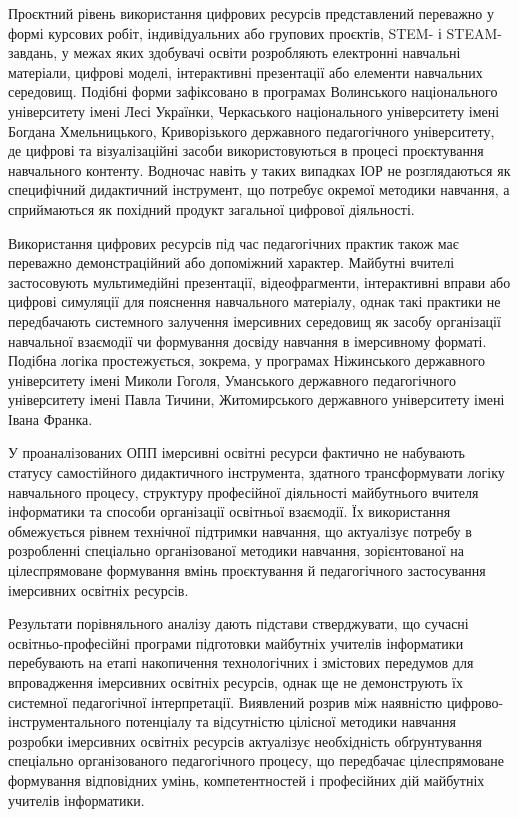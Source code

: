 Проєктний рівень використання цифрових ресурсів представлений переважно у формі курсових робіт, індивідуальних або групових проєктів, STEM- і STEAM-завдань, у межах яких здобувачі освіти розробляють електронні навчальні матеріали, цифрові моделі, інтерактивні презентації або елементи навчальних середовищ. Подібні форми зафіксовано в програмах Волинського національного університету імені Лесі Українки, Черкаського національного університету імені Богдана Хмельницького, Криворізького державного педагогічного університету, де цифрові та візуалізаційні засоби використовуються в процесі проєктування навчального контенту. Водночас навіть у таких випадках ІОР не розглядаються як специфічний дидактичний інструмент, що потребує окремої методики навчання, а сприймаються як похідний продукт загальної цифрової діяльності.

Використання цифрових ресурсів під час педагогічних практик також має переважно демонстраційний або допоміжний характер. Майбутні вчителі застосовують мультимедійні презентації, відеофрагменти, інтерактивні вправи або цифрові симуляції для пояснення навчального матеріалу, однак такі практики не передбачають системного залучення імерсивних середовищ як засобу організації навчальної взаємодії чи формування досвіду навчання в імерсивному форматі. Подібна логіка простежується, зокрема, у програмах Ніжинського державного університету імені Миколи Гоголя, Уманського державного педагогічного університету імені Павла Тичини, Житомирського державного університету імені Івана Франка.

У проаналізованих ОПП імерсивні освітні ресурси фактично не набувають статусу самостійного дидактичного інструмента, здатного трансформувати логіку навчального процесу, структуру професійної діяльності майбутнього вчителя інформатики та способи організації освітньої взаємодії. Їх використання обмежується рівнем технічної підтримки навчання, що актуалізує потребу в розробленні спеціально організованої методики навчання, зорієнтованої на цілеспрямоване формування вмінь проєктування й педагогічного застосування імерсивних освітніх ресурсів.

Результати порівняльного аналізу дають підстави стверджувати, що сучасні освітньо-професійні програми підготовки майбутніх учителів інформатики перебувають на етапі накопичення технологічних і змістових передумов для впровадження імерсивних освітніх ресурсів, однак ще не демонструють їх системної педагогічної інтерпретації. Виявлений розрив між наявністю цифрово-інструментального потенціалу та відсутністю цілісної методики навчання розробки імерсивних освітніх ресурсів актуалізує необхідність обґрунтування спеціально організованого педагогічного процесу, що передбачає цілеспрямоване формування відповідних умінь, компетентностей і професійних дій майбутніх учителів інформатики.

